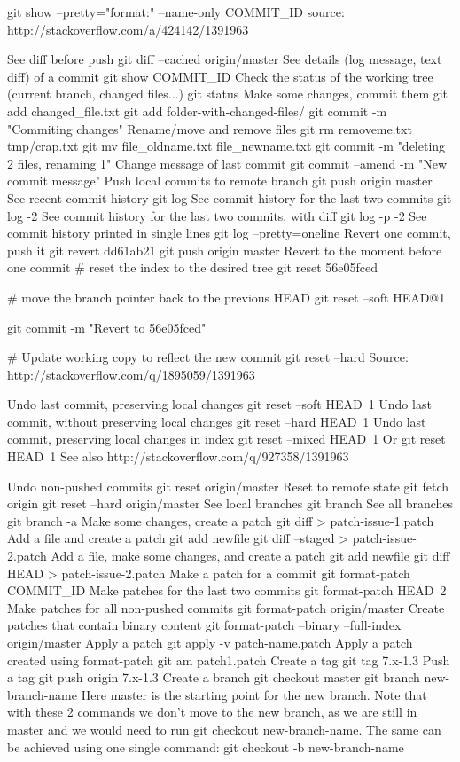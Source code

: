 \documentclass{article}
\begin{document}
git show --pretty="format:" --name-only COMMIT_ID
source: http://stackoverflow.com/a/424142/1391963

See diff before push
git diff --cached origin/master
See details (log message, text diff) of a commit
git show COMMIT_ID
Check the status of the working tree (current branch, changed files...)
git status
Make some changes, commit them
git add changed_file.txt
git add folder-with-changed-files/
git commit -m "Commiting changes"
Rename/move and remove files
git rm removeme.txt tmp/crap.txt
git mv file_oldname.txt file_newname.txt
git commit -m "deleting 2 files, renaming 1"
Change message of last commit
git commit --amend -m "New commit message"
Push local commits to remote branch
git push origin master
See recent commit history
git log
See commit history for the last two commits
git log -2
See commit history for the last two commits, with diff
git log -p -2
See commit history printed in single lines
git log --pretty=oneline
Revert one commit, push it
git revert dd61ab21
git push origin master
Revert to the moment before one commit
# reset the index to the desired tree
git reset 56e05fced

# move the branch pointer back to the previous HEAD
git reset --soft HEAD@{1}

git commit -m "Revert to 56e05fced"

# Update working copy to reflect the new commit
git reset --hard
Source: http://stackoverflow.com/q/1895059/1391963

Undo last commit, preserving local changes
git reset --soft HEAD~1
Undo last commit, without preserving local changes
git reset --hard HEAD~1
Undo last commit, preserving local changes in index
git reset --mixed HEAD~1
Or git reset HEAD~1
See also http://stackoverflow.com/q/927358/1391963

Undo non-pushed commits
git reset origin/master
Reset to remote state
git fetch origin
git reset --hard origin/master
See local branches
git branch
See all branches
git branch -a
Make some changes, create a patch
git diff > patch-issue-1.patch
Add a file and create a patch
git add newfile
git diff --staged > patch-issue-2.patch
Add a file, make some changes, and create a patch
git add newfile
git diff HEAD > patch-issue-2.patch
Make a patch for a commit
git format-patch COMMIT_ID
Make patches for the last two commits
git format-patch HEAD~2
Make patches for all non-pushed commits
git format-patch origin/master
Create patches that contain binary content
git format-patch --binary --full-index origin/master
Apply a patch
git apply -v patch-name.patch
Apply a patch created using format-patch
git am patch1.patch
Create a tag
git tag 7.x-1.3
Push a tag
git push origin 7.x-1.3
Create a branch
git checkout master
git branch new-branch-name
Here master is the starting point for the new branch. Note that with these 2 commands we don't move to the new branch, as we are still in master and we would need to run git checkout new-branch-name. The same can be achieved using one single command: git checkout -b new-branch-name
\end{document}
